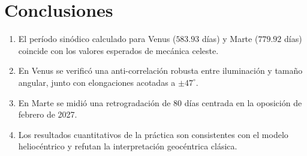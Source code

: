 \section{Conclusiones}

\begin{enumerate}
  \item El período sinódico calculado para Venus ($583.93$ días) y Marte
  ($779.92$ días) coincide con los valores esperados de mecánica celeste.
  \item En Venus se verificó una anti-correlación robusta entre iluminación y
  tamaño angular, junto con elongaciones acotadas a $\pm 47^\circ$.
  \item En Marte se midió una retrogradación de 80 días centrada en la oposición
  de febrero de 2027.
  \item Los resultados cuantitativos de la práctica son consistentes con el modelo
  heliocéntrico y refutan la interpretación geocéntrica clásica.
\end{enumerate}
